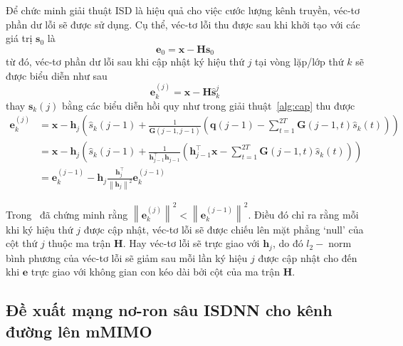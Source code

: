 Để chức minh giải thuật ISD là hiệu quả cho việc cước lượng kênh truyền, véc-tơ phần dư lỗi sẽ được sử dụng. Cụ thể, véc-tơ lỗi thu được sau khi khởi tạo với các giá trị $\mathbf{s}_0$ là
\begin{equation}
    \mathbf{e}_0 = \mathbf{x} - \mathbf{H} \mathbf{s}_0
\end{equation}
từ đó, véc-tơ phần dư lỗi sau khi cập nhật ký hiệu thứ $j$ tại vòng lặp/lớp thứ $k$ sẽ được biểu diễn như sau
\begin{equation}
    \mathbf{e}_k^{(j)}=\mathbf{x}-\mathbf{H} \hat{\mathbf{s}}_k^j
\end{equation}
thay $\mathbf{s}_k(j)$ bằng các biểu diễn hồi quy như trong giải thuật~\ref{alg:cap} thu được
\begin{equation}
\label{eq:eupdate}
\begin{aligned}
    \mathbf{e}_k^{(j)} & =\mathbf{x}-\mathbf{h}_j\left(\hat{s}_k(j-1)+\frac{1}{\mathbf{G}(j-1, j-1)}\left(\mathbf{q}(j-1)-\sum_{t=1}^{2T} \mathbf{G}(j-1, t) \hat{s}_k(t)\right)\right) \\
    & =\mathbf{x}-\mathbf{h}_j\left(\hat{s}_k(j-1)+\frac{1}{\mathbf{h}^\top_{j-1} \mathbf{h}_{j-1}}\left(\mathbf{h}_{j-1}^\top \mathbf{x}-\sum_{t=1}^{2T} \mathbf{G}(j-1, t) \hat{s}_k(t)\right)\right) \\
    & =\mathbf{e}_k^{(j-1)}-\mathbf{h}_{j} \frac{\mathbf{h}_j^\top}{\left\|\mathbf{h}_j\right\|^2} \mathbf{e}_k^{(j-1)}
    \end{aligned}
\end{equation}

Trong~\cite{Mandloi2017} đã chứng minh rằng $\left\|\mathbf{e}_k^{(j)}\right\|^2<\left\|\mathbf{e}_k^{(j-1)}\right\|^2$. Điều đó chỉ ra rằng mỗi khi ký hiệu thứ $j$ được cập nhật, véc-tơ lỗi sẽ được chiếu lên mặt phẳng `null' của cột thứ $j$ thuộc ma trận $\mathbf{H}$. Hay véc-tơ lỗi sẽ trực giao với $\mathbf{h}_j$, do đó $l_2-\operatorname{norm}$ bình phương của véc-tơ lỗi sẽ giảm sau mỗi lần ký hiệu $j$ được cập nhật cho đến khi $\mathbf{e}$ trực giao với không gian con kéo dài bởi cột của ma trận $\mathbf{H}$.

\subsection{Đề xuất mạng nơ-ron sâu ISDNN cho kênh đường lên mMIMO}

